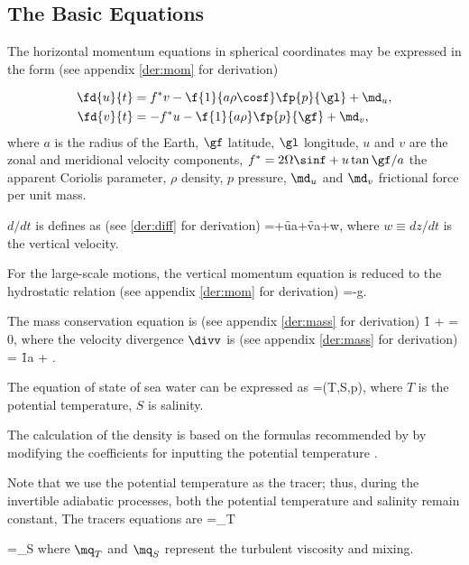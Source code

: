 
\subsection{The Basic Equations}

The horizontal momentum equations in spherical coordinates may be
expressed in the form (see appendix \ref{der:mom} for derivation)

\bese \label{eq:hor-mom}
\begin{align}
  \fd{u}{t} &= f^{*}v-\f{1}{a\rho\cosf}\fp{p}{\gl}+\md_u, \\
  \fd{v}{t} &=-f^{*}u-\f{1}{a\rho}\fp{p}{\gf}+\md_v,
\end{align}
\ense
where $a$ is the radius of the Earth, $\gf$ latitude, $\gl$
longitude, $u$ and $ $$v$ are the zonal and meridional velocity components,
$f^{*}=2\Omega\sinf+u\tan\gf/a$ the apparent Coriolis
parameter, $\rho$ density, $p$ pressure, $\md_{u}$ and
$\md_{v}$ frictional force per unit mass. 

$d/dt$ is defines as (see \ref{der:diff} for derivation)
\beeq \label{eq:sub-diff2}
=+\f{u}{a\cosf}\fp{}{\gl}+\f{v}{a}\fp{}{\gf}+w,
\eneq
where $w\equiv dz/dt$ is the vertical velocity. 


For the large-scale
motions, the vertical momentum equation is reduced to the hydrostatic
relation (see appendix \ref{der:mom} for derivation)
\beeq \label{eq:ver-mom}
=-\rho g.
\eneq


The mass conservation equation is (see appendix \ref{der:mass} for derivation)
\beeq \label{eq:mass}
\f{1}{\rho} + \divv = 0,
\eneq
where the velocity divergence $\divv$ is (see appendix \ref{der:mass} for derivation)
\beeq
\divv = \f{1}{a\cosf}  + .
\eneq

The equation of state of sea water can be expressed as
\beeq
\rho=\rho(T,S,p),
\eneq
where $T$ is the potential temperature, $S$ is salinity. 

The calculation
of the density is based on the formulas recommended by \citet{Millero1981}
by modifying the coefficients for inputting the potential temperature
\citep{Jackett1995}.

Note that we use the potential temperature as the tracer; thus,
during the invertible adiabatic processes, both the potential temperature
and salinity remain constant, The tracers equations are
\beeq \label{eq:12}
=\mq_{T}
\eneq

\beeq
{}=\mq_{S}
\eneq
 where $\mq_{T}$ and $\mq_{S}$ represent the turbulent viscosity and mixing.
